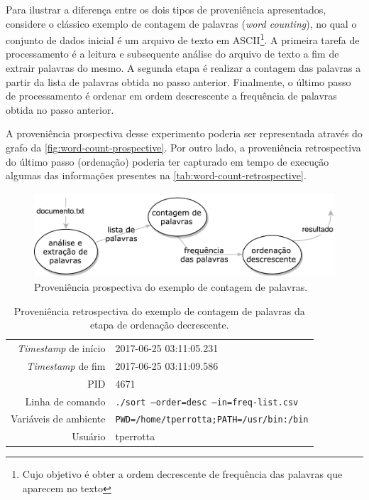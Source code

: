 Para ilustrar a diferença entre os dois tipos de proveniência apresentados, considere o clássico exemplo de contagem de palavras (\textit{word counting}), no qual o conjunto de dados inicial é um arquivo de texto em  ASCII\footnote{Cujo objetivo é obter a ordem decrescente de frequência das palavras que aparecem no texto}. A primeira tarefa de processamento é a leitura e subsequente análise do arquivo de texto a fim de extrair palavras do mesmo. A segunda etapa é realizar a contagem das palavras a partir da lista de palavras obtida no passo anterior. Finalmente, o último passo de processamento é ordenar em ordem descrescente a frequência de palavras obtida no passo anterior.

A proveniência prospectiva desse experimento poderia ser representada através do grafo da \autoref{fig:word-count-prospective}. Por outro lado, a proveniência retrospectiva do último passo (ordenação) poderia ter capturado em tempo de execução algumas das informações presentes na \autoref{tab:word-count-retrospective}.

\begin{figure}[ht]
    \centering
    \includegraphics[width=\textwidth]{img/word-count-prospective}
    \caption[Proveniência prospectiva do exemplo de contagem de palavras]{Proveniência prospectiva do exemplo de contagem de palavras.}%
    \label{fig:word-count-prospective}
\end{figure}

\begin{table}[ht]
    \centering
    \begin{tabular}{r|l}
        \hline
        \textit{Timestamp} de início & 2017-06-25 03:11:05.231                         \\
        \textit{Timestamp} de fim    & 2017-06-25 03:11:09.586                         \\
        PID                          & 4671                                            \\
        Linha de comando             & \texttt{./sort --order=desc --in=freq-list.csv} \\
        Variáveis de ambiente        & \texttt{PWD=/home/tperrotta;PATH=/usr/bin:/bin} \\
        Usuário                      & tperrotta                                       \\
        \hline
    \end{tabular}
    \caption[Proveniência retrospectiva do exemplo de contagem de palavras]{Proveniência retrospectiva do exemplo de contagem de palavras da etapa de ordenação decrescente.}%
    \label{tab:word-count-retrospective}
\end{table}

